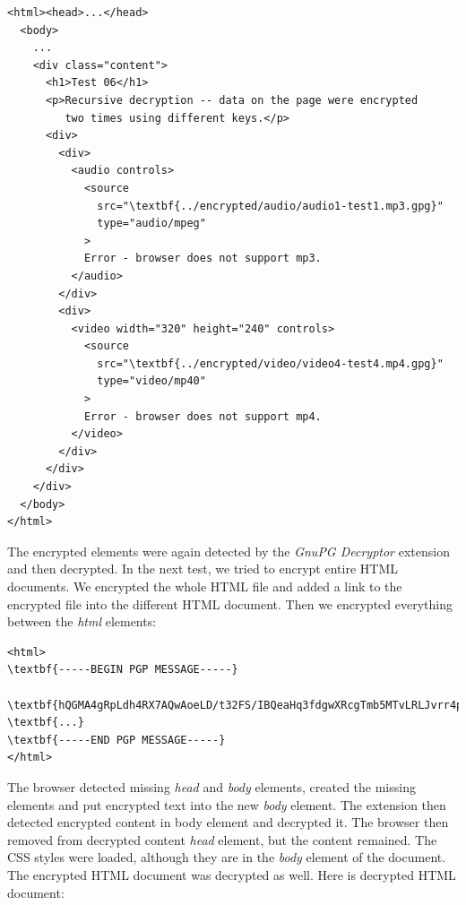 \begin{Verbatim}[commandchars=\\\{\},codes={\catcode`$=3\catcode`_=8},samepage=false,frame=single]
<html><head>...</head>
  <body>
    ...
    <div class="content">
      <h1>Test 06</h1>
      <p>Recursive decryption -- data on the page were encrypted
         two times using different keys.</p>
      <div>
        <div>
          <audio controls>
            <source
              src="\textbf{../encrypted/audio/audio1-test1.mp3.gpg}"
              type="audio/mpeg"
            >
            Error - browser does not support mp3.
          </audio>
        </div>
        <div>
          <video width="320" height="240" controls>
            <source
              src="\textbf{../encrypted/video/video4-test4.mp4.gpg}"
              type="video/mp40"
            >
            Error - browser does not support mp4.
          </video>
        </div>
      </div>
    </div>
  </body>
</html>
\end{Verbatim}

The encrypted elements were again detected by the \textit{GnuPG Decryptor} extension and then decrypted. In the next test, we tried to encrypt entire HTML documents. We encrypted the whole HTML file and added a link to the encrypted file into the different HTML document. Then we encrypted everything between the \textit{html} elements:

\begin{Verbatim}[commandchars=\\\{\},codes={\catcode`$=3\catcode`_=8},samepage=false,frame=single]
<html>
\textbf{-----BEGIN PGP MESSAGE-----}

\textbf{hQGMA4gRpLdh4RX7AQwAoeLD/t32FS/IBQeaHq3fdgwXRcgTmb5MTvLRLJvrr4pe}
\textbf{...}
\textbf{-----END PGP MESSAGE-----}
</html>
\end{Verbatim}

The browser detected missing \textit{head} and \textit{body} elements, created the missing elements and put encrypted text into the new \textit{body} element. The extension then detected encrypted content in body element and decrypted it. The browser then removed from decrypted content \textit{head} element, but the content remained. The CSS styles were loaded, although they are in the \textit{body} element of the document. The encrypted HTML document was decrypted as well. Here is decrypted HTML document:


